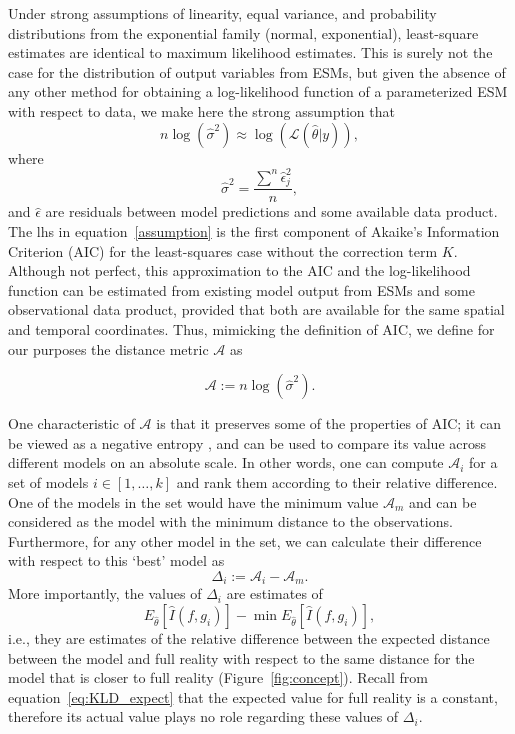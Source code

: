 \documentclass[gmd, manuscript]{copernicus}
\begin{document}
Under strong assumptions of linearity, equal variance, and probability distributions from the exponential family (normal, exponential), least-square estimates are identical to maximum likelihood estimates. This is surely not the case for the distribution of output variables from ESMs, but given the absence of any other method for obtaining a log-likelihood function of a parameterized ESM with respect to data, we make here the strong assumption that
\begin{equation} \label{assumption}
n \log(\hat{\sigma}^2) \approx \log (\mathcal{L}(\hat{\theta} | y) ),
\end{equation}
where 
\begin{equation}
\hat{\sigma}^2 = \frac{\sum^n \hat{\epsilon}_j^2 }{n},
\end{equation}
and $\hat{\epsilon}$ are residuals between model predictions and some available data product. The lhs in equation~\ref{assumption} is the first component of Akaike's Information Criterion (AIC) for the least-squares case without the correction term $K$. Although not perfect, this approximation to the AIC and the log-likelihood function can be estimated from existing model output from ESMs and some observational data product, provided that both are available for the same spatial and temporal coordinates. Thus, mimicking the definition of AIC, we define for our purposes the distance metric $\mathcal{A}$ as

\begin{equation}
\mathcal{A} := n \log (\hat{\sigma}^2).
\end{equation} 

One characteristic of $\mathcal{A}$ is that it preserves some of the properties of AIC; it can be viewed as a negative entropy \citep{Akaike1985}, and can be used to compare its value across different models on an absolute scale. In other words, one can compute $\mathcal{A}_i$ for a set of models $i \in [1, \dots ,k]$ and rank them according to their relative difference. One of the models in the set would have the minimum value $\mathcal{A}_m$ and can be considered as the model with the minimum distance to the observations. Furthermore, for any other model in the set, we can calculate their difference with respect to this `best' model as
\begin{equation}
\Delta_i := \mathcal{A}_i - \mathcal{A}_m.
\end{equation}
More importantly, the values of $\Delta_i$ are estimates of 
\begin{equation}
E_{\hat{\theta}} [\hat{I}(f, g_i)] - \min E_{\hat{\theta}} [\hat{I}(f, g_i)],
\end{equation}
i.e., they are estimates of the relative difference between the expected distance between the model and full reality with respect to the same distance for the model that is closer to full reality (Figure~\ref{fig:concept}). Recall from equation~\ref{eq:KLD_expect} that the expected value for full reality is a constant, therefore its actual value plays no role regarding these values of $\Delta_i$.
\end{document}

